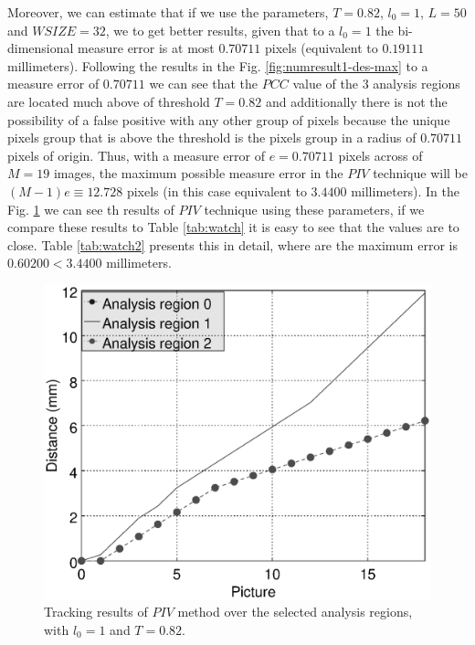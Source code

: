 Moreover, we can estimate that if we use the parameters,
$T=0.82$, $l_0=1$, $L=50$ and $WSIZE=32$, we to get better results,
given that to a $l_0=1$ the bi-dimensional measure error is at most $0.70711$ pixels 
(equivalent to $0.19111$ millimeters).
Following the results in the Fig. \ref{fig:numresult1-des-max} 
to a measure error of $0.70711$ we can see that the $PCC$ value of the $3$
analysis regions are located much above of threshold $T=0.82$ and additionally
there is not the possibility of a false positive with any other group of pixels
because the unique pixels group that is above the threshold is the pixels group in a radius
of $0.70711$ pixels of origin.
Thus, with a measure error of $e=0.70711$ pixels across of $M=19$ images,
the maximum possible measure error in the $PIV$ technique will be $(M-1)e \equiv 12.728$ pixels
(in this case equivalent to $3.4400$ millimeters).
In the Fig. \ref{fig:numresult1testa} we can see th results of $PIV$ technique using these parameters,
if we compare these results to Table \ref{tab:watch} it is easy to see that the values are to close.
Table \ref{tab:watch2} presents this in detail, where are the maximum error is $0.60200 < 3.4400$ millimeters.
\begin{figure}[H]
\centering
\includegraphics[width=\columnwidth]{numresult1-test-a.eps}
\caption{Tracking results of $PIV$ method over the selected analysis regions, with $l_0=1$ and $T=0.82$.}
\label{fig:numresult1testa}
\end{figure}

